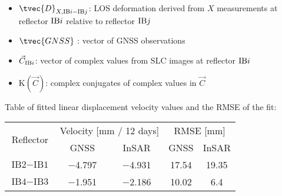 \documentclass[a0, 18pt, landscape]{a0poster}
\begin{document}
\begin{multicols}{3}
\begin{mdframed}[style=block, frametitle={Calculation of Line-of-Sight (LOS) deformations}]
{        \begin{itemize}
            \item $\tvec{D}_{X, \ibdiff}$: LOS deformation derived from $X$ measurements at reflector $\text{IB}i$ relative to reflector $\text{IB}j$
            \item $\tvec{GNSS}$ : vector of GNSS observations
            \item $\vec{C}_{\text{IB}i}$: vector of complex values from SLC images at reflector $\text{IB}i$
            \item $\text{K}(\vec{C})$: complex conjugates of complex values in $\vec{C}$
        \end{itemize}
    }
    
\end{mdframed}

\begin{mdframed}[style=block, frametitle={LOS Deformations}]
    {
        \normalfont
        \begin{center}
            Table of fitted linear displacement velocity values and the RMSE of the fit:
            \vspace{15pt}
            
            \begin{tabular}{|c||c c|c c|} \hline
                \multirow{2}{*}{Reflector} & \multicolumn{2}{c|}{Velocity [mm / 12 days]} & \multicolumn{2}{c|}{RMSE [$\si{\milli\meter}$]} \\
                & GNSS & InSAR & GNSS & InSAR \\ \hline \hline
                $\text{IB2}-\text{IB1}$ & \num{-4.797} & \num{-4.931} & \num{17.54} & \num{19.35} \\ 
                $\text{IB4}-\text{IB3}$ & \num{-1.951} & \num{-2.186} & \num{10.02} & \num{6.4} \\ \hline
            \end{tabular}
        \end{center}
    }

\end{mdframed}


\end{multicols}
\end{document}
